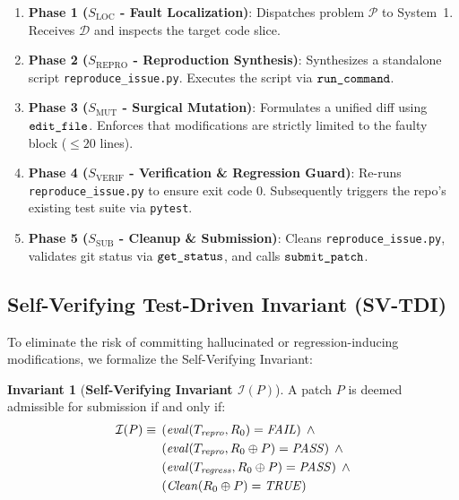\documentclass[10pt,twocolumn,letterpaper]{article}
\theoremstyle{definition}
\newtheorem{invariant}{Invariant}
\begin{document}
\begin{enumerate}
    \item \textbf{Phase 1 ($S_{\text{LOC}}$ - Fault Localization)}: Dispatches problem $\mathcal{P}$ to System~1. Receives $\mathcal{D}$ and inspects the target code slice.
    \item \textbf{Phase 2 ($S_{\text{REPRO}}$ - Reproduction Synthesis)}: Synthesizes a standalone script \texttt{reproduce\_issue.py}. Executes the script via $\text{\texttt{run\_command}}$. 
    \item \textbf{Phase 3 ($S_{\text{MUT}}$ - Surgical Mutation)}: Formulates a unified diff using $\text{\texttt{edit\_file}}$. Enforces that modifications are strictly limited to the faulty block ($\le 20$ lines).
    \item \textbf{Phase 4 ($S_{\text{VERIF}}$ - Verification \& Regression Guard)}: Re-runs \texttt{reproduce\_issue.py} to ensure exit code 0. Subsequently triggers the repo's existing test suite via \texttt{pytest}.
    \item \textbf{Phase 5 ($S_{\text{SUB}}$ - Cleanup \& Submission)}: Cleans \texttt{reproduce\_issue.py}, validates git status via $\text{\texttt{get\_status}}$, and calls $\text{\texttt{submit\_patch}}$.
\end{enumerate}

\subsection{Self-Verifying Test-Driven Invariant (SV-TDI)}
To eliminate the risk of committing hallucinated or regression-inducing modifications, we formalize the Self-Verifying Invariant:

\begin{invariant}[\textbf{Self-Verifying Invariant $\mathcal{I}(P)$}]
A patch $P$ is deemed admissible for submission if and only if:
\begin{align}
    \mathcal{I}(P) \equiv &\; \left( \text{\emph{eval}}(T_{\text{\emph{repro}}}, R_0) = \text{\emph{FAIL}} \right) \;\land \nonumber \\
    &\; \left( \text{\emph{eval}}(T_{\text{\emph{repro}}}, R_0 \oplus P) = \text{\emph{PASS}} \right) \;\land \nonumber \\
    &\; \left( \text{\emph{eval}}(T_{\text{\emph{regress}}}, R_0 \oplus P) = \text{\emph{PASS}} \right) \;\land \nonumber \\
    &\; \left( \text{\emph{Clean}}(R_0 \oplus P) = \text{\emph{TRUE}} \right)
\end{align}
\end{invariant}
\end{document}
